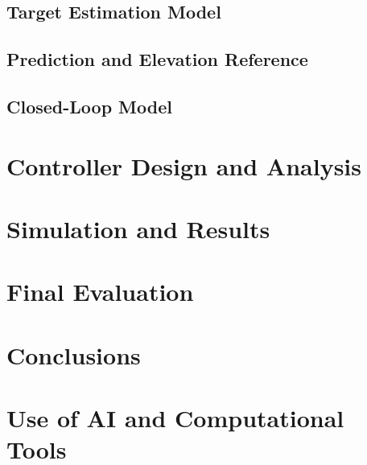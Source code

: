 \documentclass[conference]{IEEEtran}
\begin{document}
\subsection{Target Estimation Model}
\subsection{Prediction and Elevation Reference}
\subsection{Closed-Loop Model}

\section{Controller Design and Analysis}

\section{Simulation and Results}

\section{Final Evaluation}

\section{Conclusions}


% 

\clearpage
\appendices
\section{Use of AI and Computational Tools}
\end{document}
